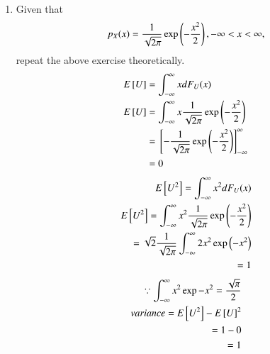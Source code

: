 \documentclass[journal,12pt,twocolumn]{IEEEtran}
\renewcommand\thesection{\arabic{section}}
\begin{document}
\begin{enumerate}[label=\thesection.\arabic*
,ref=\thesection.\theenumi]
\begin{lstlisting}
./out
\end{lstlisting}
\begin{lstlisting}
We get : Mean is 0.000685
        Variance is 1.000025
\end{lstlisting}
\item Given that 
\begin{align}
p_{X}(x) = \frac{1}{\sqrt{2\pi}}\exp\left(-\frac{x^2}{2}\right), -\infty < x < \infty,
\end{align}
repeat the above exercise theoretically.\\
\solution 
\begin{align}
E{}\left[U\right] & = \int_{-\infty}^{\infty}x dF_{U}(x)\\
E{}\left[U\right] & = \int_{-\infty}^{\infty}x \frac{1}{\sqrt{2\pi}}\exp\left(-\frac{x^2}{2}\right)\\ & = {}\left[-\frac{1}{\sqrt{2\pi}}\exp\left(-\frac{x^2}{2}\right)\right]_{-\infty}^{\infty}\\ & = 0
\end{align}
\begin{align}
E{}\left[U^2\right] = \int_{-\infty}^{\infty}x^2 dF_{U}(x) \\
E{}\left[U^2\right] = \int_{-\infty}^{\infty}x^2 \frac{1}{\sqrt{2\pi}}\exp\left(-\frac{x^2}{2}\right)\\ = \sqrt{2} \frac{1}{\sqrt{2\pi}} \int_{-\infty}^{\infty} 2x^2 \exp\left(-x^2\right)\\ = 1
\end{align}
\begin{align}
\because \int_{-\infty}^{\infty} x^2 \exp{-x^2} = \frac{\sqrt{\pi}}{2}\\
variance = E{}\left[U^2\right] - {E{}\left[U\right]}^2\\ = 1-0 \\ = 1
\end{align}
%
\end{enumerate}
\end{document}
